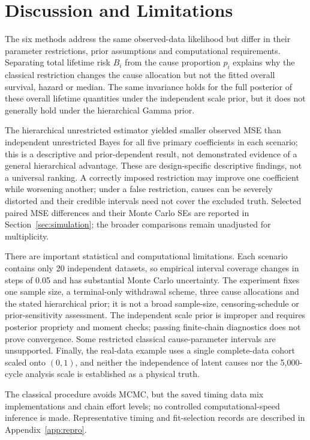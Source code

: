 \documentclass[a4paper,11pt]{article}
\begin{document}
\section{Discussion and Limitations}\label{sec:discussion}
The six methods address the same observed-data likelihood but differ in their parameter restrictions, prior assumptions and computational requirements. Separating total lifetime risk $B_i$ from the cause proportion $p_i$ explains why the classical restriction changes the cause allocation but not the fitted overall survival, hazard or median. The same invariance holds for the full posterior of these overall lifetime quantities under the independent scale prior, but it does not generally hold under the hierarchical Gamma prior.

The hierarchical unrestricted estimator yielded smaller observed MSE than independent unrestricted Bayes for all five primary coefficients in each scenario; this is a descriptive and prior-dependent result, not demonstrated evidence of a general hierarchical advantage. These are design-specific descriptive findings, not a universal ranking. A correctly imposed restriction may improve one coefficient while worsening another; under a false restriction, causes can be severely distorted and their credible intervals need not cover the excluded truth. Selected paired MSE differences and their Monte Carlo SEs are reported in Section~\ref{sec:simulation}; the broader comparisons remain unadjusted for multiplicity.

There are important statistical and computational limitations. Each scenario contains only 20 independent datasets, so empirical interval coverage changes in steps of 0.05 and has substantial Monte Carlo uncertainty. The experiment fixes one sample size, a terminal-only withdrawal scheme, three cause allocations and the stated hierarchical prior; it is not a broad sample-size, censoring-schedule or prior-sensitivity assessment. The independent scale prior is improper and requires posterior propriety and moment checks; passing finite-chain diagnostics does not prove convergence. Some restricted classical cause-parameter intervals are unsupported. Finally, the real-data example uses a single complete-data cohort scaled onto $(0,1)$, and neither the independence of latent causes nor the 5,000-cycle analysis scale is established as a physical truth.

The classical procedure avoids MCMC, but the saved timing data mix implementations and chain effort levels; no controlled computational-speed inference is made. Representative timing and fit-selection records are described in Appendix~\ref{app:repro}.
\end{document}
